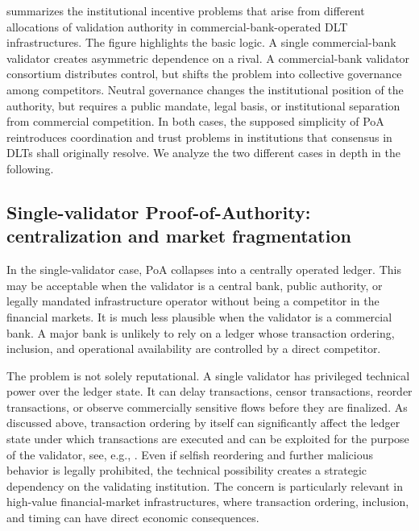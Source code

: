 \documentclass[
reprint,
showkeys,
superscriptaddress,
aps,
pra,
longbibliography,
nofootinbib,
]{revtex4-2}
\theoremstyle{definition}\newtheorem{definition}{Definition}
\begin{document}
 summarizes the institutional incentive problems that arise from different allocations of validation authority in commercial-bank-operated DLT infrastructures.
The figure highlights the basic logic. 
A single commercial-bank validator creates asymmetric dependence on a rival. A commercial-bank validator consortium distributes control, but shifts the problem into collective governance among competitors.
Neutral governance changes the institutional position of the authority, but requires a public mandate, legal basis, or institutional separation from commercial competition.
In both cases, the supposed simplicity of PoA reintroduces coordination and trust problems in institutions that consensus in DLTs shall originally resolve.
We analyze the two different cases in depth in the following.



\subsection{Single-validator Proof-of-Authority: centralization and market fragmentation}
In the single-validator case, PoA collapses into a centrally operated ledger. 
This may be acceptable when the validator is a central bank, public authority, or legally mandated infrastructure operator without being a competitor in the financial markets.
It is much less plausible when the validator is a commercial bank.
A major bank is unlikely to rely on a ledger whose transaction ordering, inclusion, and operational availability are controlled by a direct competitor.

The problem is not solely reputational.
A single validator has privileged technical power over the ledger state.
It can delay transactions, censor transactions, reorder transactions, or observe commercially sensitive flows before they are finalized.
As discussed above, transaction ordering by itself can significantly affect the ledger state under which transactions are executed and can be exploited for the purpose of the validator, see, e.g., \cite{daian2020flashboys,eskandari2019transparent}.
Even if selfish reordering and further malicious behavior is legally prohibited, the technical possibility creates a strategic dependency on the validating institution.
The concern is particularly relevant in high-value financial-market infrastructures, where transaction ordering, inclusion, and timing can have direct economic consequences.
\end{document}
